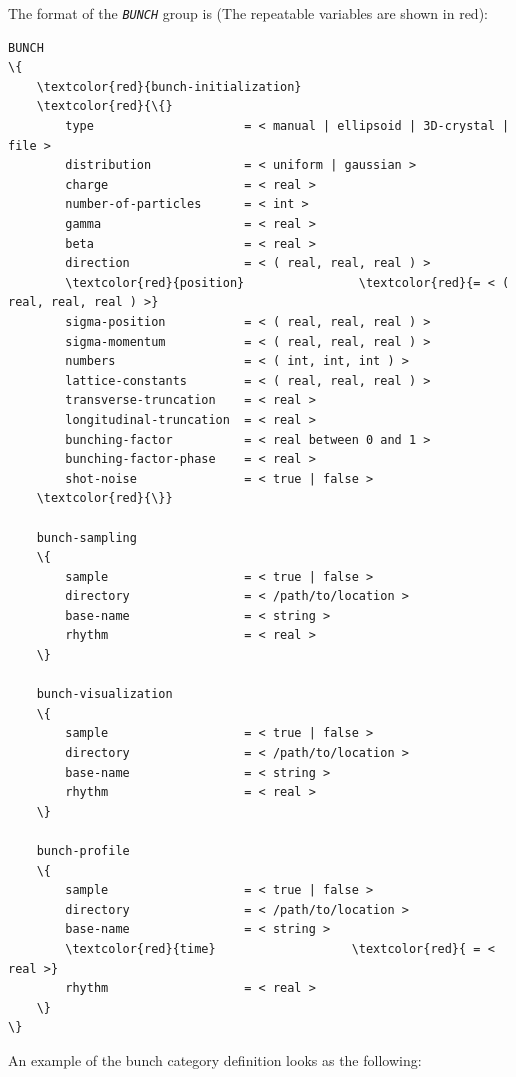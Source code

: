 The format of the {\tt \small \em BUNCH} group is (The repeatable variables are shown in red):
%
\begin{Verbatim}[frame=single, fontsize=\small, tabsize=4, fontfamily=courier, fontseries=b, commandchars=\\\{\}, obeytabs]
BUNCH
\{
	\textcolor{red}{bunch-initialization}
	\textcolor{red}{\{}
		type  					 = < manual | ellipsoid | 3D-crystal | file >
		distribution  			 = < uniform | gaussian >
		charge  				 = < real >
		number-of-particles		 = < int >
		gamma  					 = < real >
		beta  					 = < real >
		direction  				 = < ( real, real, real ) >
		\textcolor{red}{position}				 \textcolor{red}{= < ( real, real, real ) >}
		sigma-position  		 = < ( real, real, real ) >
		sigma-momentum  		 = < ( real, real, real ) >
		numbers					 = < ( int, int, int ) >
		lattice-constants		 = < ( real, real, real ) >
		transverse-truncation	 = < real >
		longitudinal-truncation  = < real >
		bunching-factor			 = < real between 0 and 1 >
		bunching-factor-phase	 = < real >
		shot-noise  			 = < true | false >
	\textcolor{red}{\}}

	bunch-sampling
	\{
		sample  				 = < true | false >
		directory  				 = < /path/to/location >
		base-name  				 = < string >
		rhythm  				 = < real >
	\}

	bunch-visualization
	\{
		sample  				 = < true | false >
		directory  				 = < /path/to/location >
		base-name  				 = < string >
		rhythm  				 = < real >
	\}

	bunch-profile
	\{
		sample  				 = < true | false >
		directory  				 = < /path/to/location >
		base-name  				 = < string >
		\textcolor{red}{time}					\textcolor{red}{ = < real >}
		rhythm  				 = < real >
	\}
\}
\end{Verbatim}
%
An example of the bunch category definition looks as the following:
%

